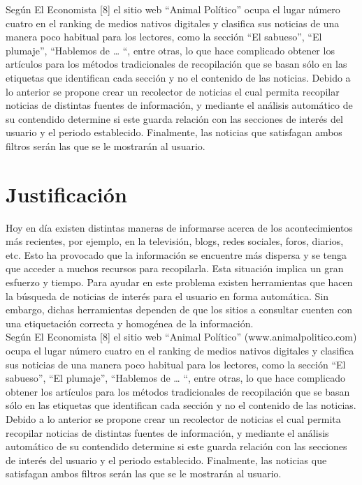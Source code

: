 Según El Economista [8] el sitio web “Animal Político” ocupa el lugar número cuatro en el ranking de medios nativos digitales y clasifica sus noticias de una manera poco habitual para los lectores, como la sección “El sabueso”, “El plumaje”, “Hablemos de … “, entre otras, lo que hace complicado obtener los artículos para los métodos tradicionales de recopilación que se basan sólo en las etiquetas que identifican cada sección y no el contenido de las noticias.
Debido a lo anterior se propone crear un recolector de noticias el cual permita recopilar noticias de distintas fuentes de información, y mediante el análisis automático de su contendido determine si este guarda relación con las secciones de interés del usuario y el periodo establecido. Finalmente, las noticias que satisfagan ambos filtros serán las que se le mostrarán al usuario.

\section{Justificación}


Hoy en día existen distintas maneras de informarse acerca de los acontecimientos más recientes, por ejemplo, en la televisión, blogs, redes sociales, foros, diarios, etc. Esto ha provocado que la información se encuentre más dispersa y se tenga que acceder a muchos recursos para recopilarla. Esta situación implica un gran esfuerzo y tiempo. Para ayudar en este problema existen herramientas que hacen la búsqueda de noticias de interés para el usuario en forma automática. Sin embargo, dichas herramientas dependen de que los sitios a consultar cuenten con una etiquetación correcta y homogénea de la información.\\

Según El Economista [8] el sitio web “Animal Político” (www.animalpolitico.com) ocupa el lugar número cuatro en el ranking de medios nativos digitales y clasifica sus noticias de una manera poco habitual para los lectores, como la sección “El sabueso”, “El plumaje”, “Hablemos de … “, entre otras, lo que hace complicado obtener los artículos para los métodos tradicionales de recopilación que se basan sólo en las etiquetas que identifican cada sección y no el contenido de las noticias.
Debido a lo anterior se propone crear un recolector de noticias el cual permita recopilar noticias de distintas fuentes de información, y mediante el análisis automático de su contendido determine si este guarda relación con las secciones de interés del usuario y el periodo establecido. Finalmente, las noticias que satisfagan ambos filtros serán las que se le mostrarán al usuario.

